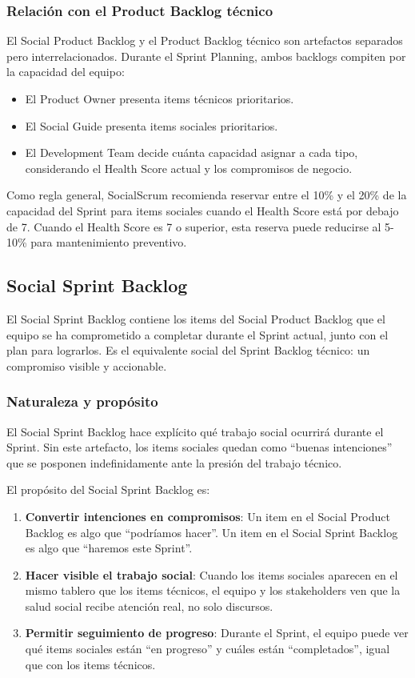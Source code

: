 \subsubsection{Relación con el Product Backlog técnico}

El Social Product Backlog y el Product Backlog técnico son artefactos separados pero interrelacionados. Durante el Sprint Planning, ambos backlogs compiten por la capacidad del equipo:

\begin{itemize}
    \item El Product Owner presenta items técnicos prioritarios.
    \item El Social Guide presenta items sociales prioritarios.
    \item El Development Team decide cuánta capacidad asignar a cada tipo, considerando el Health Score actual y los compromisos de negocio.
\end{itemize}

Como regla general, SocialScrum recomienda reservar entre el 10\% y el 20\% de la capacidad del Sprint para items sociales cuando el Health Score está por debajo de 7. Cuando el Health Score es 7 o superior, esta reserva puede reducirse al 5-10\% para mantenimiento preventivo.

\subsection{Social Sprint Backlog}

El Social Sprint Backlog contiene los items del Social Product Backlog que el equipo se ha comprometido a completar durante el Sprint actual, junto con el plan para lograrlos. Es el equivalente social del Sprint Backlog técnico: un compromiso visible y accionable.

\subsubsection{Naturaleza y propósito}

El Social Sprint Backlog hace explícito qué trabajo social ocurrirá durante el Sprint. Sin este artefacto, los items sociales quedan como ``buenas intenciones'' que se posponen indefinidamente ante la presión del trabajo técnico.

El propósito del Social Sprint Backlog es:

\begin{enumerate}
    \item \textbf{Convertir intenciones en compromisos}: Un item en el Social Product Backlog es algo que ``podríamos hacer''. Un item en el Social Sprint Backlog es algo que ``haremos este Sprint''.
    \item \textbf{Hacer visible el trabajo social}: Cuando los items sociales aparecen en el mismo tablero que los items técnicos, el equipo y los stakeholders ven que la salud social recibe atención real, no solo discursos.
    \item \textbf{Permitir seguimiento de progreso}: Durante el Sprint, el equipo puede ver qué items sociales están ``en progreso'' y cuáles están ``completados'', igual que con los items técnicos.
\end{enumerate}

